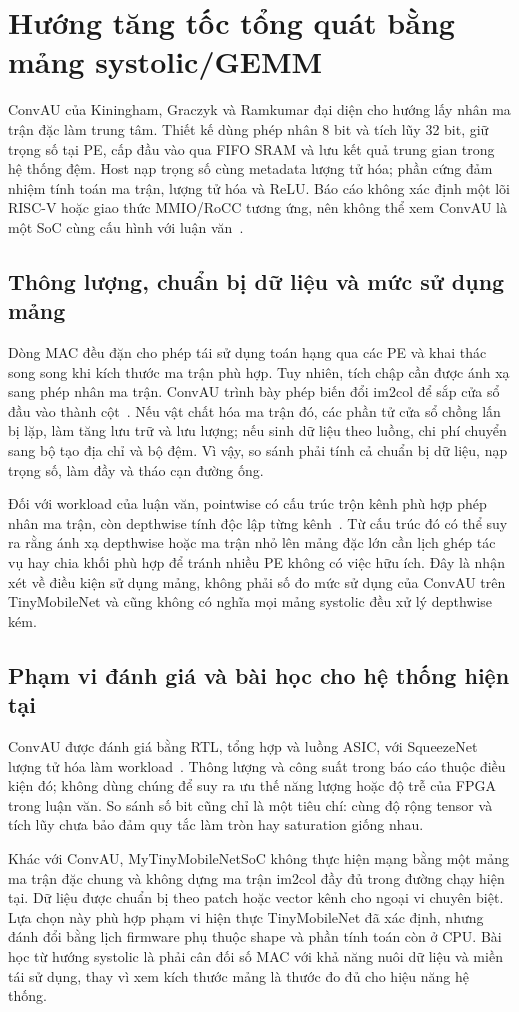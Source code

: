 \section{Hướng tăng tốc tổng quát bằng mảng systolic/GEMM}
ConvAU của Kiningham, Graczyk và Ramkumar đại diện cho hướng lấy nhân ma trận đặc làm trung tâm. Thiết kế dùng phép nhân 8 bit và tích lũy 32 bit, giữ trọng số tại PE, cấp đầu vào qua FIFO SRAM và lưu kết quả trung gian trong hệ thống đệm. Host nạp trọng số cùng metadata lượng tử hóa; phần cứng đảm nhiệm tính toán ma trận, lượng tử hóa và ReLU. Báo cáo không xác định một lõi RISC-V hoặc giao thức MMIO/RoCC tương ứng, nên không thể xem ConvAU là một SoC cùng cấu hình với luận văn~\cite[Sections~3--4]{kiningham2016design}.

\subsection{Thông lượng, chuẩn bị dữ liệu và mức sử dụng mảng}
Dòng MAC đều đặn cho phép tái sử dụng toán hạng qua các PE và khai thác song song khi kích thước ma trận phù hợp. Tuy nhiên, tích chập cần được ánh xạ sang phép nhân ma trận. ConvAU trình bày phép biến đổi im2col để sắp cửa sổ đầu vào thành cột~\cite[Section~4.2]{kiningham2016design}. Nếu vật chất hóa ma trận đó, các phần tử cửa sổ chồng lấn bị lặp, làm tăng lưu trữ và lưu lượng; nếu sinh dữ liệu theo luồng, chi phí chuyển sang bộ tạo địa chỉ và bộ đệm. Vì vậy, so sánh phải tính cả chuẩn bị dữ liệu, nạp trọng số, làm đầy và tháo cạn đường ống.

Đối với workload của luận văn, pointwise có cấu trúc trộn kênh phù hợp phép nhân ma trận, còn depthwise tính độc lập từng kênh~\cite[Section~3.1]{howard2017mobilenets}. Từ cấu trúc đó có thể suy ra rằng ánh xạ depthwise hoặc ma trận nhỏ lên mảng đặc lớn cần lịch ghép tác vụ hay chia khối phù hợp để tránh nhiều PE không có việc hữu ích. Đây là nhận xét về điều kiện sử dụng mảng, không phải số đo mức sử dụng của ConvAU trên TinyMobileNet và cũng không có nghĩa mọi mảng systolic đều xử lý depthwise kém.

\subsection{Phạm vi đánh giá và bài học cho hệ thống hiện tại}
ConvAU được đánh giá bằng RTL, tổng hợp và luồng ASIC, với SqueezeNet lượng tử hóa làm workload~\cite[Section~5]{kiningham2016design}. Thông lượng và công suất trong báo cáo thuộc điều kiện đó; không dùng chúng để suy ra ưu thế năng lượng hoặc độ trễ của FPGA trong luận văn. So sánh số bit cũng chỉ là một tiêu chí: cùng độ rộng tensor và tích lũy chưa bảo đảm quy tắc làm tròn hay saturation giống nhau.

Khác với ConvAU, MyTinyMobileNetSoC không thực hiện mạng bằng một mảng ma trận đặc chung và không dựng ma trận im2col đầy đủ trong đường chạy hiện tại. Dữ liệu được chuẩn bị theo patch hoặc vector kênh cho ngoại vi chuyên biệt. Lựa chọn này phù hợp phạm vi hiện thực TinyMobileNet đã xác định, nhưng đánh đổi bằng lịch firmware phụ thuộc shape và phần tính toán còn ở CPU. Bài học từ hướng systolic là phải cân đối số MAC với khả năng nuôi dữ liệu và miền tái sử dụng, thay vì xem kích thước mảng là thước đo đủ cho hiệu năng hệ thống.
